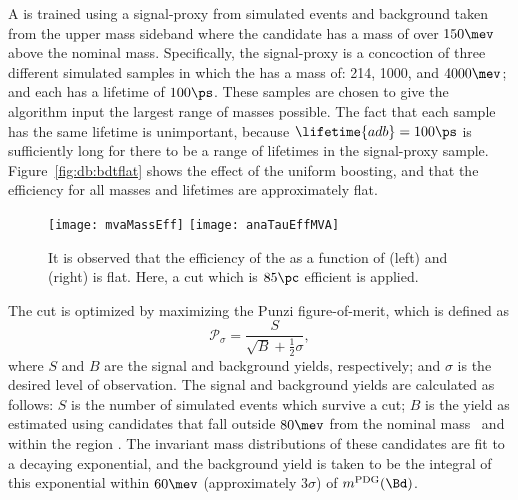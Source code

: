 A \uBDT is trained using a signal-proxy from simulated events and background taken from the upper
\Bd mass sideband where the \Bd candidate has a mass of over $150\mev$ above the nominal \Bd mass.
Specifically, the signal-proxy is a concoction of three different simulated samples in which the
\db has a mass of: 214, 1000, and $4000\mev$; and each has a lifetime of $100\ps$.
These samples are chosen to give the \uBDT algorithm input the largest range of masses possible.
The fact that each sample has the same lifetime is unimportant, because $\lifetime{adb}=100\ps$ is
sufficiently long for there to be a range of lifetimes in the signal-proxy sample.
Figure~\ref{fig:db:bdtflat} shows the effect of the uniform boosting, and that the efficiency for
all masses and lifetimes are approximately flat.

\begin{figure}
  \begin{center}
    \texttt{[image: mvaMassEff]}
    \texttt{[image: anaTauEffMVA]}
    \caption[Signal efficiency of the uBDT as a function of mass and lifetime]
    {
      It is observed that the efficiency of the \uBDT as a function of
      (left) \mdb and
      (right) \tdb is flat.
      Here, a cut which is \approx$85\pc$ efficient is applied.
    }
    \label{fig:bdt:eff:tau}
  \end{center}
\end{figure}


%

The \uBDT cut is optimized  by maximizing
the Punzi figure-of-merit, which is defined as
\begin{equation}
  \mathcal{P}_\sigma = \frac{S}{\sqrt{B} + \tfrac12\sigma},
  \label{eq:db:punzi}
\end{equation}
where $S$ and $B$ are the signal and background yields, respectively; and $\sigma$ is the desired
level of observation.
The signal and background yields are calculated as follows:
$S$ is the number of simulated events which survive a \uBDT cut;
$B$ is the yield as estimated using \btokstrdb candidates
that fall outside $80\mev$ from the nominal \Bd mass~\cite{PDG2014} and within the region .
The invariant mass distributions of these candidates are fit to a decaying exponential,
and the background yield is taken to be the integral of this exponential within $60\mev$
(approximately $3\sigma$) of $m^\mathrm{PDG}(\Bd)$.

